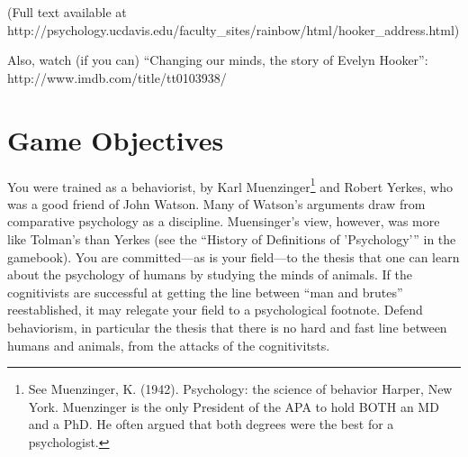 (Full text available at http:\slash \slash psychology.ucdavis.edu\slash faculty\_sites\slash rainbow\slash html\slash hooker\_address.html) 

Also, watch (if you can) “Changing our minds, the story of Evelyn Hooker”: http:\slash \slash www.imdb.com\slash title\slash tt0103938\slash 

\section{Game Objectives}
\label{gameobjectives}

You were trained as a behaviorist, by Karl Muenzinger\footnote{See Muenzinger, K. (1942). Psychology: the science of behavior Harper, New York. Muenzinger is the only President of the APA to hold BOTH an MD and a PhD. He often argued that both degrees were the best for a psychologist.} and Robert Yerkes, who was a good friend of John Watson. Many of Watson's arguments draw from comparative psychology as a discipline. Muensinger's view, however, was more like Tolman's than Yerkes (see the “History of Definitions of 'Psychology'” in the gamebook). You are committed—as is your field—to the thesis that one can learn about the psychology of humans by studying the minds of animals. If the cognitivists are successful at getting the line between “man and brutes” reestablished, it may relegate your field to a psychological footnote. Defend behaviorism, in particular the thesis that there is no hard and fast line between humans and animals, from the attacks of the cognitivitsts.

